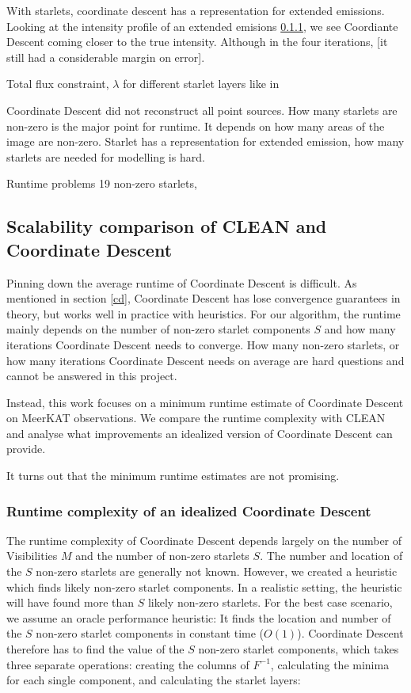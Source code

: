 With starlets, coordinate descent has a representation for extended emissions. Looking at the intensity profile of an extended emisions \ref{}, we see Coordiante Descent coming closer to the true intensity. Although in the four iterations,  [it still had a considerable margin on error]. 

Total flux constraint, $\lambda$ for different starlet layers like in \cite{girard2015sparse}

Coordinate Descent did not reconstruct all point sources. How many starlets are non-zero is the major point for runtime. It depends on how many areas of the image are non-zero. Starlet has a representation for extended emission, how many starlets are needed for modelling is hard.

Runtime problems
19 non-zero starlets, 


\subsection{Scalability comparison of CLEAN and Coordinate Descent}
Pinning down the average runtime of Coordinate Descent is difficult. As mentioned in section \ref{cd}, Coordinate Descent has lose convergence guarantees in theory, but works well in practice with heuristics. For our algorithm, the runtime mainly depends on the number of non-zero starlet components $S$ and how many iterations Coordinate Descent needs to converge. How many non-zero starlets, or how many iterations Coordinate Descent needs on average are hard questions and cannot be answered in this project.

Instead, this work focuses on a minimum runtime estimate of Coordinate Descent on MeerKAT observations. We compare the runtime complexity with CLEAN and analyse what improvements an idealized version of Coordinate Descent can provide.

It turns out that the minimum runtime estimates are not promising.


\subsubsection{Runtime complexity of an idealized Coordinate Descent}
The runtime complexity of Coordinate Descent depends largely on the number of Visibilities $M$ and the number of non-zero starlets $S$. The number and location of the $S$ non-zero starlets are generally not known. However, we created a heuristic which finds likely non-zero starlet components. In a realistic setting, the heuristic will have found more than $S$ likely non-zero starlets. For the best case scenario, we assume an oracle performance heuristic: It finds the location and number of the $S$ non-zero starlet components in constant time ($O(1)$). Coordinate Descent therefore has to find the value of the $S$ non-zero starlet components, which takes three separate operations: creating the columns of $F^{-1}$, calculating the minima for each single component, and calculating the starlet layers:

